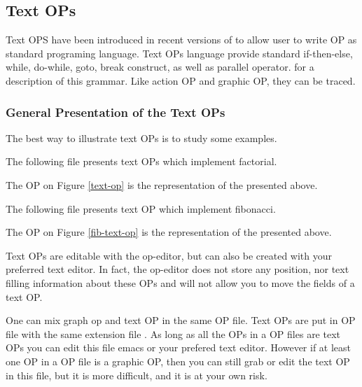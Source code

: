 \subsection{Text OPs}

Text OPS have been introduced in recent versions of \COPRS{} to allow user to
write OP as standard programing language. Text OPs language provide standard
if-then-else, while, do-while, goto, break construct, as well as parallel
operator.   for a
description of this grammar. Like action OP and graphic OP, they can be traced.



\subsubsection{General Presentation of the Text OPs}

The best way to illustrate text OPs is to study some examples.

The following file presents text OPs which implement factorial.



The OP on Figure \ref{text-op} is the \OPE{} representation of the  presented above.

The following file presents text OP which implement fibonacci.


The OP on Figure \ref{fib-text-op} is the \OPE{} representation of the
 presented above.

Text OPs  are editable with the op-editor, but can also be created with your
preferred text editor. In fact, the op-editor does not store any position, nor
text filling information about these OPs and will not allow you to move the
fields of a text OP. 

One can mix graph op and text OP in the same OP file. Text OPs are put in OP
file with  the same extension file . As long as all the OPs in a OP
files are text OPs you can edit this file emacs or your prefered text editor.
However if  at least one OP in a OP file is a graphic OP, then you can  still
grab or edit the text OP in this file, but it is more difficult, and it is at
your own risk.

